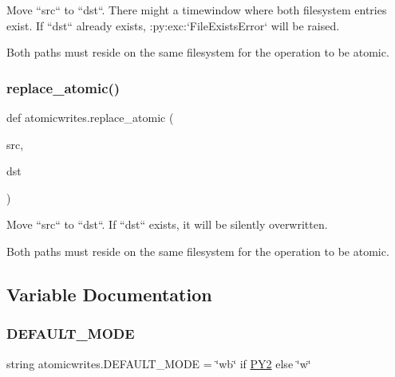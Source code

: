 \begin{DoxyVerb}Move ``src`` to ``dst``. There might a timewindow where both filesystem
entries exist. If ``dst`` already exists, :py:exc:`FileExistsError` will be
raised.

Both paths must reside on the same filesystem for the operation to be
atomic.
\end{DoxyVerb}
 \mbox{\label{namespaceatomicwrites_a0b838ddf6d04138974560f54882d1d7c}} 
\subsubsection{\texorpdfstring{replace\+\_\+atomic()}{replace\_atomic()}}
{\footnotesize\ttfamily def atomicwrites.\+replace\+\_\+atomic (\begin{DoxyParamCaption}\item[{}]{src,  }\item[{}]{dst }\end{DoxyParamCaption})}

\begin{DoxyVerb}Move ``src`` to ``dst``. If ``dst`` exists, it will be silently
overwritten.

Both paths must reside on the same filesystem for the operation to be
atomic.
\end{DoxyVerb}
 

\subsection{Variable Documentation}
\mbox{\label{namespaceatomicwrites_a1df24b2608e442584eb44060eeb599ad}} 
\subsubsection{\texorpdfstring{D\+E\+F\+A\+U\+L\+T\+\_\+\+M\+O\+DE}{DEFAULT\_MODE}}
{\footnotesize\ttfamily string atomicwrites.\+D\+E\+F\+A\+U\+L\+T\+\_\+\+M\+O\+DE = \char`\"{}wb\char`\"{} if \hyperlink{namespaceatomicwrites_a142f5f24b1f83a61fca862b2b4f1202c}{P\+Y2} else \char`\"{}w\char`\"{}}

